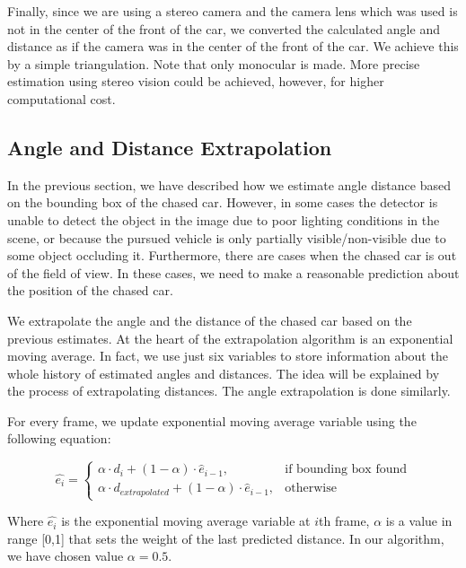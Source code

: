 \documentclass{ctuthesis/ctuthesis}
\begin{document}
Finally, since we are using a stereo camera and the camera lens which was used is not in the center of the front of the car, we converted the calculated angle and distance as if the camera was in the center of the front of the car. We achieve this by a simple triangulation. Note that only monocular is made. More precise estimation using stereo vision could be achieved, however, for higher computational cost.




\subsection{Angle and Distance Extrapolation}
In the previous section, we have described how we estimate angle distance based on the bounding box of the chased car. However, in some cases the detector is unable to detect the object in the image due to poor lighting conditions in the scene, or because the pursued vehicle is only partially visible/non-visible due to some object occluding it. Furthermore, there are cases when the chased car is out of the field of view. In these cases, we need to make a reasonable prediction about the position of the chased car. \par


We extrapolate the angle and the distance of the chased car based on the previous estimates. At the heart of the extrapolation algorithm is an exponential moving average. In fact, we use just six variables to store information about the whole history of estimated angles and distances. The idea will be explained by the process of extrapolating distances. The angle extrapolation is done similarly. \par


For every frame, we update exponential moving average variable using the following equation:\par


\begin{equation}
    \hat{e_{i}}=
    \begin{cases}
      \alpha\cdot d_i + (1-\alpha)\cdot \hat{e}_{i-1}, & \text{if bounding box found} \\
      \alpha\cdot d_{extrapolated} + (1-\alpha)\cdot \hat{e}_{i-1}, & \text{otherwise}
    \end{cases}
\end{equation}

Where $\hat{e_{i}}$ is the exponential moving average variable at $i$th frame, $\alpha$ is a value in range [0,1] that sets the weight of the last predicted distance. In our algorithm, we have chosen value $\alpha=0.5$. \par
\end{document}
